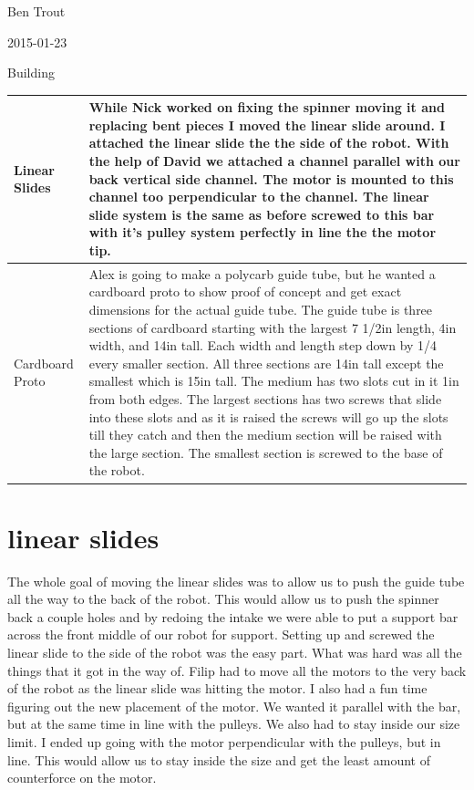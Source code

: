 Ben Trout

2015-01-23

Building

\begin{tabular}{|p{5cm}|p{5cm}|}
\hline
Linear Slides&
While Nick worked on fixing the spinner moving it and replacing bent pieces I moved the linear slide around. I attached the linear slide the the side of the robot. With the help of David we attached a channel parallel with our back vertical side channel. The motor is mounted to this channel too perpendicular to the channel. The linear slide system is the same as before screwed to this bar with it’s pulley system perfectly in line the the motor tip.
\\
\hline
Cardboard Proto&
Alex is going to make a polycarb guide tube, but he wanted a cardboard proto to show proof of concept and get exact dimensions for the actual guide tube. The guide tube is three sections of cardboard starting with the largest 7 1/2in length, 4in width, and 14in tall. Each width and length step down by 1/4 every smaller section. All three sections are 14in tall except the smallest which is 15in tall. The medium has two slots cut in it 1in from both edges. The largest sections has two screws that slide into these slots and as it is raised the screws will go up the slots till they catch and then the medium section will be raised with the large section. The smallest section is screwed to the base of the robot. 
\\
\hline
\end{tabular}

\section*{linear slides}
The whole goal of moving the linear slides was to allow us to push the guide tube all the way to the back of the robot. This would allow us to push the spinner back a couple holes and by redoing the intake we were able to put a support bar across the front middle of our robot for support. Setting up and screwed the linear slide to the side of the robot was the easy part. What was hard was all the things that it got in the way of. Filip had to move all the motors to the very back of the robot as the linear slide was hitting the motor. I also had a fun time figuring out the new placement of the motor. We wanted it parallel with the bar, but at the same time in line with the pulleys. We also had to stay inside our size limit. I ended up going with the motor perpendicular with the pulleys, but in line. This would allow us to stay inside the size and get the least amount of counterforce on the motor. 

